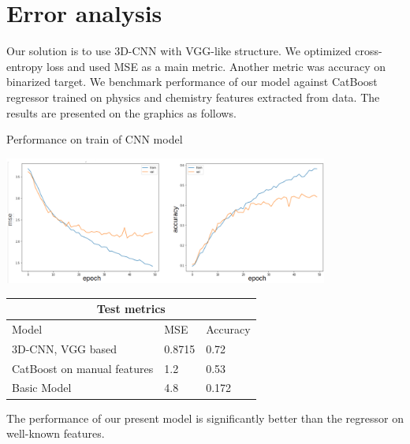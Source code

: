 \section{Error analysis}
Our solution is to use 3D-CNN with VGG-like structure. We optimized cross-entropy loss and used MSE as a main metric. Another metric was accuracy on binarized target. 
We benchmark performance of our model against CatBoost regressor trained on physics and chemistry features extracted from data. 
The results are presented on the graphics as follows.
\begin{center}
\caption{Performance on train of CNN model}
\includegraphics[width=0.8\textwidth]{contents/CNN_error.png}
\end{center}

\begin{tabular}{ |p{5cm}|p{5cm}|p{5cm}|  }
        \hline
        \multicolumn{3}{|c|}{Test metrics} \\
        \hline
        Model & MSE & Accuracy\\
        \hline
        3D-CNN, VGG based & 0.8715 & 0.72\\
        CatBoost on manual features & 1.2 & 0.53\\
        Basic Model & 4.8 & 0.172\\
        \hline
\end{tabular}

The performance of our present model is significantly better than the regressor on well-known features.